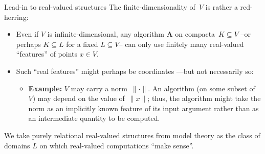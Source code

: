 \documentclass{beamer}
\begin{document}
\begin{frame}{Lead-in to real-valued structures}
 The \alert{finite-dimensionality} of~$V$ is rather a \alert{red-herring}:
  \begin{itemize}
  \item Even if $V$ is infinite-dimensional, any algorithm $\mathbf{A}$ on compacta~$K\subseteq V$
    –or perhaps $K\subseteq L$ for a fixed $L\subseteq V$–
    can only use \alert{finitely many real-valued “features”} of points $x\in V$.
  \item Such “real features” might perhaps be coordinates —but not necessarily so:
    \begin{itemize}
    \item \textbf{Example:} $V$ may carry a norm~$\|\cdot\|$.
      An algorithm (on some subset of~$V$) may depend on the value of~$\|x\|$;
      thus, the algorithm might take the \alert{norm as an implicitly known feature} of its input argument rather than as an intermediate quantity to be computed.
    \end{itemize}
  \end{itemize}
  We take \alert{purely relational real-valued structures} from model theory as the class of domains $L$ on which real-valued computations “make sense”.
\end{frame}

\end{document}
